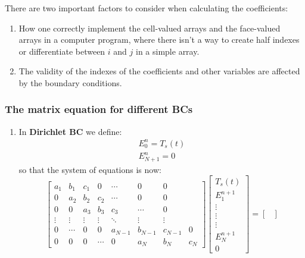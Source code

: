 \documentclass[11pt]{article}
\begin{document}
\begin{enumerate}
    \begin{notebox}
      There are two important factors to consider when calculating the coefficients:
      \begin{enumerate}
        \item How one correctly implement the cell-valued arrays and the face-valued arrays in a computer program, where there isn't a way to create half indexes or differentiate between $i$ and $j$ in a simple array.
        \item The validity of the indexes of the coefficients and other variables are affected by the boundary conditions.
      \end{enumerate}
    \end{notebox}
    \subsubsection{The matrix equation for different BCs}
    \begin{enumerate}
    \item In \textbf{Dirichlet BC} we define:
    \begin{gather}
      E_0^{n} = T_s(t) \\
      E_{N+1}^{n} = 0
    \end{gather}
    so that the system of equations is now:
    \begin{equation}
    \begin{bmatrix}
    a_1 & b_1 & c_1 & 0 & \cdots & 0 & 0\\
    0 & a_2 & b_2 & c_2 & \cdots & 0 & 0 \\  
    0 & 0 & a_3 & b_3 & c_3 &\cdots & 0 \\
    \vdots & \vdots & \vdots & \vdots & \ddots & \vdots & \vdots \\
    0  & \cdots & 0 & 0 & a_{N-1} & b_{N-1} & c_{N-1} & 0 \\
    0 & 0 & 0 & \cdots & 0 & a_{N} & b_{N} & c_{N}
    \end{bmatrix}
    \begin{bmatrix}
    T_s(t) \\
    E_1^{n+1} \\
    \vdots \\
    \vdots \\
    \vdots \\
    E_{N}^{n+1} \\
    0
    \end{bmatrix}
    =
    \begin{bmatrix}

\end{bmatrix}
\end{equation}
\end{enumerate}
\end{enumerate}
\end{document}

